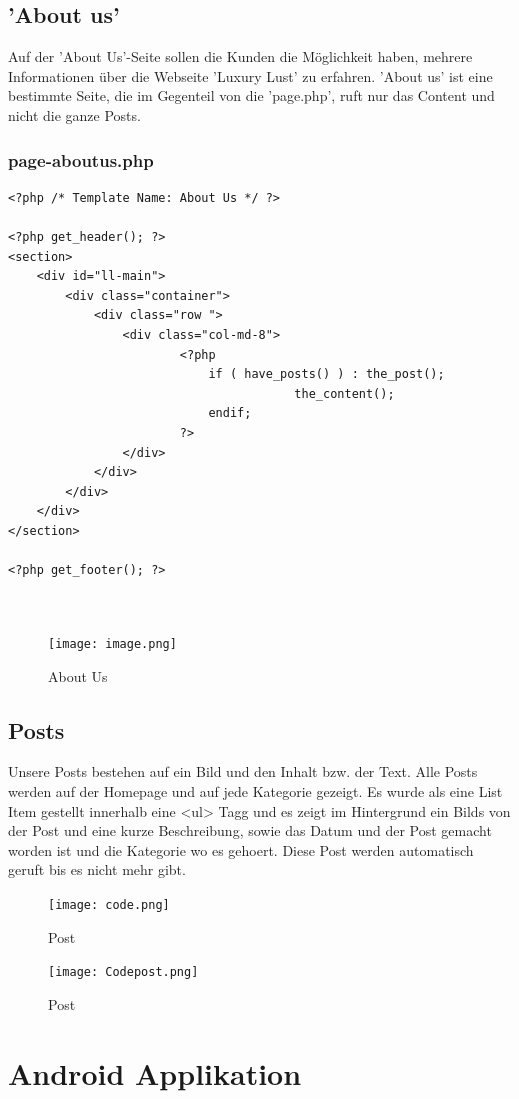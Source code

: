 \section{'About us'}
Auf der 'About Us'-Seite sollen die Kunden die Möglichkeit haben, mehrere Informationen über die Webseite 'Luxury Lust' zu erfahren.
'About us' ist eine bestimmte Seite, die im Gegenteil von die 'page.php', ruft nur das Content und nicht die ganze Posts.
\newline
\subsection*{page-aboutus.php}
\begin{verbatim}
<?php /* Template Name: About Us */ ?>

<?php get_header(); ?>
<section>
	<div id="ll-main">
		<div class="container">
			<div class="row ">
				<div class="col-md-8">
						<?php 
							if ( have_posts() ) : the_post();
										the_content();	
							endif;
						?>
				</div>
			</div>
		</div>
	</div>
</section>

<?php get_footer(); ?>



\end{verbatim}
\begin{figure}[!h]
  \texttt{[image: image.png]}
  \caption{About Us}
  \label{fig:aboutus}
\end{figure}

\section{Posts}
Unsere Posts bestehen auf ein Bild und den Inhalt bzw. der Text. Alle Posts werden auf der Homepage und auf jede Kategorie gezeigt. Es wurde als eine List Item gestellt innerhalb eine <ul>  Tagg und es zeigt im Hintergrund ein Bilds von der Post und eine kurze Beschreibung, sowie das Datum und der Post gemacht worden ist und die Kategorie wo es gehoert. Diese Post werden automatisch geruft bis es nicht mehr gibt.


\begin{figure}[!h]
  \texttt{[image: code.png]}
  \caption{Post}
  \label{fig:post}
\end{figure}

\begin{figure}[!h]
  \texttt{[image: Codepost.png]}
  \caption{Post}
  \label{fig:post}
\end{figure}


\chapter{Android Applikation}


